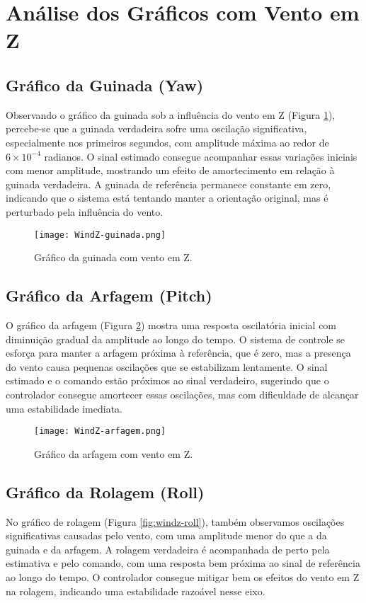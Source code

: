 \section*{Análise dos Gráficos com Vento em Z}

\subsection*{Gráfico da Guinada (Yaw)}
Observando o gráfico da guinada sob a influência do vento em Z (Figura \ref{fig:windz-yaw}), percebe-se que a guinada verdadeira sofre uma oscilação significativa, especialmente nos primeiros segundos, com amplitude máxima ao redor de \(6 \times 10^{-4}\) radianos. O sinal estimado consegue acompanhar essas variações iniciais com menor amplitude, mostrando um efeito de amortecimento em relação à guinada verdadeira. A guinada de referência permanece constante em zero, indicando que o sistema está tentando manter a orientação original, mas é perturbado pela influência do vento.

\begin{figure}[h!]
    \centering
    \texttt{[image: WindZ-guinada.png]}
    \caption{Gráfico da guinada com vento em Z.}
    \label{fig:windz-yaw}
\end{figure}

\subsection*{Gráfico da Arfagem (Pitch)}
O gráfico da arfagem (Figura \ref{fig:windz-pitch}) mostra uma resposta oscilatória inicial com diminuição gradual da amplitude ao longo do tempo. O sistema de controle se esforça para manter a arfagem próxima à referência, que é zero, mas a presença do vento causa pequenas oscilações que se estabilizam lentamente. O sinal estimado e o comando estão próximos ao sinal verdadeiro, sugerindo que o controlador consegue amortecer essas oscilações, mas com dificuldade de alcançar uma estabilidade imediata.

\begin{figure}[h!]
    \centering
    \texttt{[image: WindZ-arfagem.png]}
    \caption{Gráfico da arfagem com vento em Z.}
    \label{fig:windz-pitch}
\end{figure}

\subsection*{Gráfico da Rolagem (Roll)}
No gráfico de rolagem (Figura \ref{fig:windz-roll}), também observamos oscilações significativas causadas pelo vento, com uma amplitude menor do que a da guinada e da arfagem. A rolagem verdadeira é acompanhada de perto pela estimativa e pelo comando, com uma resposta bem próxima ao sinal de referência ao longo do tempo. O controlador consegue mitigar bem os efeitos do vento em Z na rolagem, indicando uma estabilidade razoável nesse eixo.

